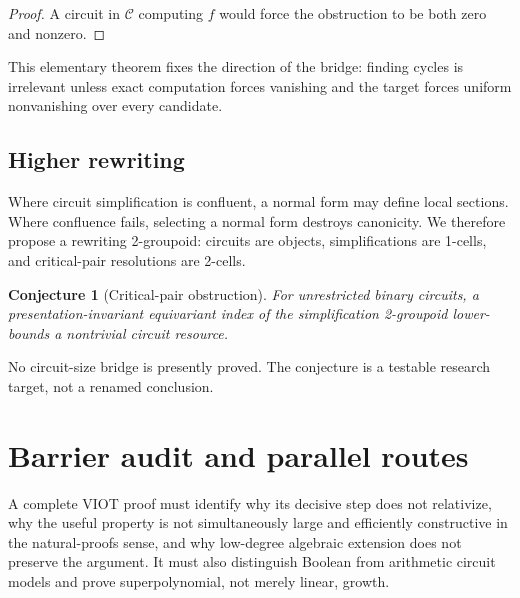 \documentclass[11pt]{article}
\newtheorem{conjecture}[theorem]{Conjecture}
\theoremstyle{definition}
\begin{document}
\begin{proof}
A circuit in \(\mathcal C\) computing \(f\) would force the obstruction to
be both zero and nonzero.
\end{proof}

This elementary theorem fixes the direction of the bridge: finding cycles is
irrelevant unless exact computation forces vanishing and the target forces
uniform nonvanishing over every candidate.

\subsection{Higher rewriting}

Where circuit simplification is confluent, a normal form may define local
sections. Where confluence fails, selecting a normal form destroys
canonicity. We therefore propose a rewriting 2-groupoid: circuits are objects,
simplifications are 1-cells, and critical-pair resolutions are 2-cells.

\begin{conjecture}[Critical-pair obstruction]
For unrestricted binary circuits, a presentation-invariant equivariant index
of the simplification 2-groupoid lower-bounds a nontrivial circuit resource.
\end{conjecture}

No circuit-size bridge is presently proved. The conjecture is a testable
research target, not a renamed conclusion.

\section{Barrier audit and parallel routes}

A complete VIOT proof must identify why its decisive step does not relativize,
why the useful property is not simultaneously large and efficiently
constructive in the natural-proofs sense, and why low-degree algebraic
extension does not preserve the argument. It must also distinguish Boolean
from arithmetic circuit models and prove superpolynomial, not merely linear,
growth.
\end{document}
